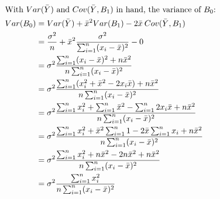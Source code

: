 \documentclass{article}
\begin{document}
\begin{align*}
    \intertext{With $Var(\bar{Y})$ and $Cov(\bar{Y}, B_1)$ in hand, the variance of $B_0$:}
    Var(B_0) & = Var(\bar{Y}) + \bar{x}^2 Var(B_1) - 2\bar{x}\:Cov(\bar{Y}, B_1)                                                                            \\
             & = \frac{\sigma^2}{n} + \bar{x}^2 \frac{\sigma^2}{\sum_{i=1}^n (x_i - \bar{x})^2} - 0                                                         \\
             & = \sigma^2 \frac{\sum_{i=1}^n (x_i - \bar{x})^2 + n \bar{x}^2}{n \sum_{i=1}^n (x_i - \bar{x})^2}                                             \\
             & = \sigma^2 \frac{\sum_{i=1}^n (x_i^2 + \bar{x}^2 - 2x_i\bar{x}) + n \bar{x}^2}{n \sum_{i=1}^n (x_i - \bar{x})^2}                             \\
             & = \sigma^2 \frac{\sum_{i=1}^n x_i^2 + \sum_{i=1}^n \bar{x}^2 - \sum_{i=1}^n 2x_i\bar{x} + n \bar{x}^2}{n \sum_{i=1}^n (x_i - \bar{x})^2}     \\
             & = \sigma^2 \frac{\sum_{i=1}^n x_i^2 + \bar{x}^2 \sum_{i=1}^n 1 - 2 \bar{x} \sum_{i=1}^n x_i + n \bar{x}^2}{n \sum_{i=1}^n (x_i - \bar{x})^2} \\
             & = \sigma^2 \frac{\sum_{i=1}^n x_i^2 + n \bar{x}^2 - 2n \bar{x}^2 + n \bar{x}^2}{n \sum_{i=1}^n (x_i - \bar{x})^2}                            \\
             & = \sigma^2 \frac{\sum_{i=1}^n x_i^2}{n \sum_{i=1}^n (x_i - \bar{x})^2}                                                                       \\
\end{align*}
\end{document}
